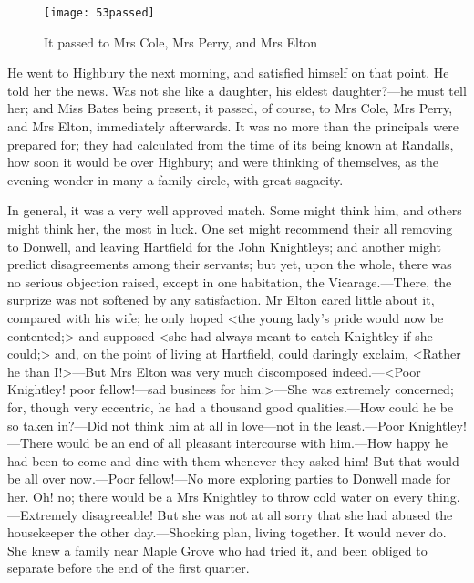 \begin{figure}[tbph]
\centering
\texttt{[image: 53passed]}
\caption{It passed to Mrs Cole, Mrs Perry, and Mrs Elton}
\end{figure}

He went to Highbury the next morning, and satisfied himself on that point. He told her the news. Was not she like a daughter, his eldest daughter?—he must tell her; and Miss Bates being present, it passed, of course, to Mrs Cole, Mrs Perry, and Mrs Elton, immediately afterwards. It was no more than the principals were prepared for; they had calculated from the time of its being known at Randalls, how soon it would be over Highbury; and were thinking of themselves, as the evening wonder in many a family circle, with great sagacity.

In general, it was a very well approved match. Some might think him, and others might think her, the most in luck. One set might recommend their all removing to Donwell, and leaving Hartfield for the John Knightleys; and another might predict disagreements among their servants; but yet, upon the whole, there was no serious objection raised, except in one habitation, the Vicarage.—There, the surprize was not softened by any satisfaction. Mr Elton cared little about it, compared with his wife; he only hoped <the young lady's pride would now be contented;> and supposed <she had always meant to catch Knightley if she could;> and, on the point of living at Hartfield, could daringly exclaim, <Rather he than I\@!>—But Mrs Elton was very much discomposed indeed.—<Poor Knightley! poor fellow!—sad business for him.>—She was extremely concerned; for, though very eccentric, he had a thousand good qualities.—How could he be so taken in?—Did not think him at all in love—not in the least.—Poor Knightley!—There would be an end of all pleasant intercourse with him.—How happy he had been to come and dine with them whenever they asked him! But that would be all over now.—Poor fellow!—No more exploring parties to Donwell made for her. Oh! no; there would be a Mrs Knightley to throw cold water on every thing.—Extremely disagreeable! But she was not at all sorry that she had abused the housekeeper the other day.—Shocking plan, living together. It would never do. She knew a family near Maple Grove who had tried it, and been obliged to separate before the end of the first quarter.